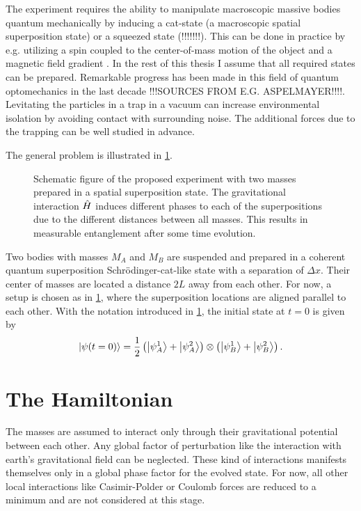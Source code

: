 The experiment requires the ability to manipulate macroscopic massive bodies quantum mechanically by inducing a cat-state (a macroscopic spatial superposition state) or a squeezed state (!!!!!!!). 
This can be done in practice by e.g. utilizing a spin coupled to the center-of-mass motion of the object and a magnetic field gradient \cite{Bose_2017}. In the rest of this thesis I assume that all required states can be prepared.
Remarkable progress has been made in this field of quantum optomechanics in the last decade !!!SOURCES FROM E.G. ASPELMAYER!!!!.
Levitating the particles in a trap in a vacuum can increase environmental isolation by avoiding contact with surrounding noise. The additional forces due to the trapping can be well studied in advance.

The general problem is illustrated in \cref{fig:2:simple-problem}.
\begin{figure}[!htbp]
  \centering
  \def\svgwidth{\textwidth}
  
  \caption{Schematic figure of the proposed experiment with two masses prepared in a spatial superposition state. The gravitational interaction $\hat{H}$ induces different phases to each of the superpositions due to the different distances between all masses. This results in measurable entanglement after some time evolution.}
  \label{fig:2:simple-problem}
\end{figure}
Two bodies with masses $M_A$ and $M_B$ are suspended and prepared in a coherent quantum superposition Schrödinger-cat-like state with a separation of $\Delta x$.
Their center of masses are located a distance $2L$ away from each other.
For now, a setup is chosen as in \cref{fig:2:simple-problem}, where the superposition locations are aligned parallel to each other.
With the notation introduced in \cref{fig:2:simple-problem}, the initial state at $t=0$ is given by
\begin{equation}\label{eq:2:initial-state}
  \ket{\psi(t=0)} = \frac{1}{2}\left( \ket{\psi_A^1} + \ket{\psi_A^2} \right) \otimes \left( \ket{\psi_B^1} + \ket{\psi_B^2} \right) .
\end{equation}



\section{The Hamiltonian}
The masses are assumed to interact only through their gravitational potential between each other. Any global factor of perturbation like the interaction with earth's gravitational field can be neglected. These kind of interactions manifests themselves only in a global phase factor for the evolved state.
For now, all other local interactions like Casimir-Polder \cite{Casimir_1948} or Coulomb forces are reduced to a minimum and are not considered at this stage.

